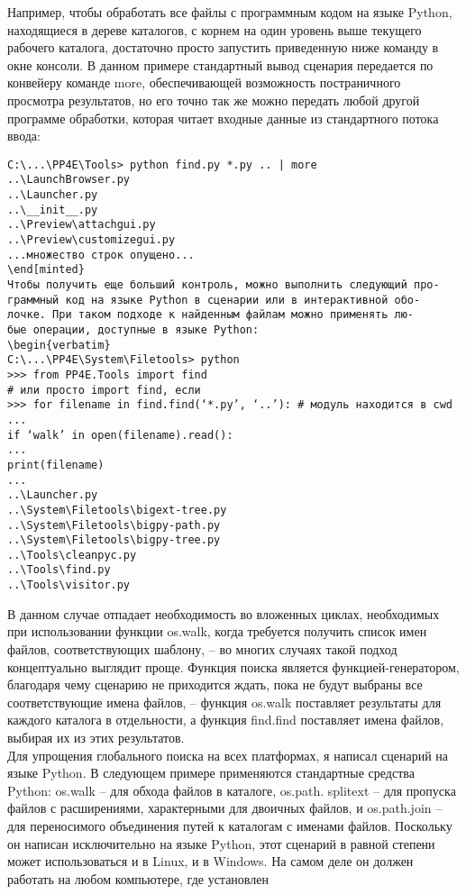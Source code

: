 \documentclass[12pt]{article}
\begin{document}
Например, чтобы обработать все файлы с программным кодом на языке Python, находящиеся в дереве каталогов, с корнем на один уровень
выше текущего рабочего каталога, достаточно просто запустить приведенную ниже команду в окне консоли. В данном примере стандартный вывод
сценария передается по конвейеру команде more, обеспечивающей возможность постраничного просмотра результатов, но его точно так же можно передать любой другой программе обработки, которая читает
входные данные из стандартного потока ввода:
\begin{verbatim}
C:\...\PP4E\Tools> python find.py *.py .. | more
..\LaunchBrowser.py
..\Launcher.py
..\__init__.py
..\Preview\attachgui.py
..\Preview\customizegui.py
...множество строк опущено...
\end[minted}
Чтобы получить еще больший контроль, можно выполнить следующий про-
граммный код на языке Python в сценарии или в интерактивной обо-
лочке. При таком подходе к найденным файлам можно применять лю-
бые операции, доступные в языке Python:
\begin{verbatim}
C:\...\PP4E\System\Filetools> python
>>> from PP4E.Tools import find
# или просто import find, если
>>> for filename in find.find(‘*.py’, ‘..’): # модуль находится в cwd
...
if ‘walk’ in open(filename).read():
...
print(filename)
...
..\Launcher.py
..\System\Filetools\bigext-tree.py
..\System\Filetools\bigpy-path.py
..\System\Filetools\bigpy-tree.py
..\Tools\cleanpyc.py
..\Tools\find.py
..\Tools\visitor.py
\end{verbatim}
В данном случае отпадает необходимость во вложенных циклах, необходимых при использовании функции os.walk, когда требуется получить список имен файлов, соответствующих шаблону, – во многих случаях такой подход концептуально выглядит проще. Функция поиска является функцией-генератором,
благодаря чему сценарию не приходится ждать, пока не будут выбраны
все соответствующие имена файлов, – функция os.walk поставляет результаты для каждого каталога в отдельности, а функция find.find поставляет имена файлов, выбирая их из этих результатов.\\
Для
упрощения глобального поиска на всех платформах, я написал сценарий на языке Python. В следующем примере применяются стандартные средства Python: os.walk – для обхода файлов в каталоге, os.path.
splitext – для пропуска файлов с расширениями, характерными для
двоичных файлов, и os.path.join – для переносимого объединения путей
к каталогам с именами файлов.
Поскольку он написан исключительно на языке Python, этот сценарий в равной степени может использоваться и в Linux, и в Windows. На
самом деле он должен работать на любом компьютере, где установлен
\end{document}
